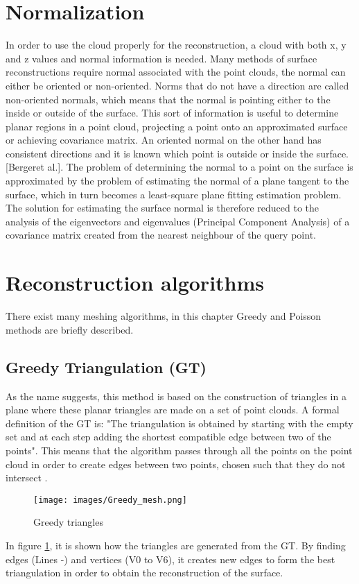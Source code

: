 \documentclass[a4paper]{report}
\begin{document}
\section{Normalization}
In order to use the cloud properly for the reconstruction, a cloud with both x, y and z
values and normal information is needed. Many methods of surface reconstructions
require normal associated with the point clouds, the normal can either be oriented
or non-oriented. Norms that do not have a direction are called non-oriented normals,
which means that the normal is pointing either to the inside or
outside of the surface. This sort of information is useful to determine planar regions
in a point cloud, projecting a point onto an approximated surface or achieving covariance
matrix. An oriented normal on the other hand has consistent directions
and it is known which point is outside or inside the surface.[Bergeret al.].
The problem of determining the normal to a point on the surface is approximated by
the problem of estimating the normal of a plane tangent to the surface, which in turn
becomes a least-square plane fitting estimation problem. The solution for estimating
the surface normal is therefore reduced to the analysis of the eigenvectors and eigenvalues
(Principal Component Analysis) of a covariance matrix created from
the nearest neighbour of the query point.
\section{Reconstruction algorithms}
There exist many meshing algorithms, in this chapter Greedy and Poisson methods are briefly described.
\subsection{Greedy Triangulation (GT)}
As the name suggests, this method is based on the construction of triangles in a
plane where these planar triangles are made on a set of point clouds. A formal
definition of the GT is: "The triangulation is obtained by starting with the empty set and
at each step adding the shortest compatible edge between two of the points". This means
that the algorithm passes through all the points on the point cloud in order to create edges between two points, chosen such that they do not intersect \cite{proj2}.



\begin{figure}[h]
\centering
\texttt{[image: images/Greedy\_mesh.png]}
\caption{Greedy triangles \cite{proj2}}
\label{GT_triangles}
\end{figure}
In figure \ref{GT_triangles}, it is shown how the triangles are generated from the GT. By finding edges (Lines -) and vertices (V0 to V6), it creates new edges to form the best triangulation in order to obtain the reconstruction of the surface.
\end{document}

